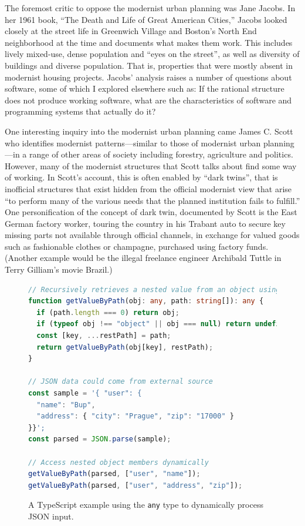The foremost critic to oppose the modernist urban planning was Jane Jacobs. In her 1961 book,
``The Death and Life of Great American Cities,'' Jacobs looked closely at
the street life in Greenwich Village and Boston's North End neighborhood at the time and
documents what makes them work. This includes lively mixed-use, dense population and
``eyes on the street'', as well as diversity of buildings and diverse population. That is,
properties that were mostly absent in modernist housing projects. Jacobs' analysis
raises a number of questions about software, some of which I explored
elsewhere such as:
If the rational structure does not produce working software, what are the characteristics
of software and programming systems that actually do it?

One interesting inquiry into the modernist urban planning came James C. Scott who identifies
modernist patterns---similar to those of modernist urban planning---in a range of other
areas of society including forestry, agriculture and politics. However, many of the modernist
structures that Scott talks about find some way of working. In Scott's account, this is often
enabled by ``dark twins'', that is inofficial structures that exist hidden from the official
modernist view that arise ``to perform many of the various needs that the planned institution
fails to fulfill.'' One personification of the concept of dark twin,
documented by Scott is the East German factory worker, touring the country in his Trabant
auto to secure key missing parts not available through official channels, in exchange for
valued goods such as fashionable clothes or champagne, purchased using factory funds.
(Another example would be the illegal freelance engineer Archibald Tuttle in Terry Gilliam's
movie Brazil.)


\begin{figure}
\begin{lstlisting}[language=ts]
// Recursively retrieves a nested value from an object using a path
function getValueByPath(obj: any, path: string[]): any {
  if (path.length === 0) return obj;
  if (typeof obj !== "object" || obj === null) return undefined;
  const [key, ...restPath] = path;
  return getValueByPath(obj[key], restPath);
}

// JSON data could come from external source
const sample = '{ "user": {
  "name": "Bup",
  "address": { "city": "Prague", "zip": "17000" }
}}';
const parsed = JSON.parse(sample);

// Access nested object members dynamically
getValueByPath(parsed, ["user", "name"]);
getValueByPath(parsed, ["user", "address", "zip"]);
\end{lstlisting}
\caption{A TypeScript example using the \texttt{any} type to dynamically process JSON input.}
\label{fig:any}
\end{figure}

